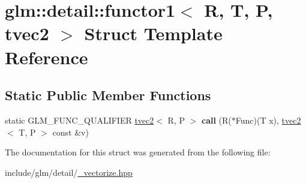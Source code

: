 \hypertarget{structglm_1_1detail_1_1functor1_3_01R_00_01T_00_01P_00_01tvec2_01_4}{}\section{glm\+:\+:detail\+:\+:functor1$<$ R, T, P, tvec2 $>$ Struct Template Reference}
\label{structglm_1_1detail_1_1functor1_3_01R_00_01T_00_01P_00_01tvec2_01_4}
\subsection*{Static Public Member Functions}
\begin{DoxyCompactItemize}
\item 
\mbox{\label{structglm_1_1detail_1_1functor1_3_01R_00_01T_00_01P_00_01tvec2_01_4_aaabd54c114db7c12681014fcbcf763bf}} 
static G\+L\+M\+\_\+\+F\+U\+N\+C\+\_\+\+Q\+U\+A\+L\+I\+F\+I\+ER \hyperlink{structglm_1_1tvec2}{tvec2}$<$ R, P $>$ {\bfseries call} (R($\ast$Func)(T x), \hyperlink{structglm_1_1tvec2}{tvec2}$<$ T, P $>$ const \&v)
\end{DoxyCompactItemize}


The documentation for this struct was generated from the following file\+:\begin{DoxyCompactItemize}
\item 
include/glm/detail/\hyperlink{__vectorize_8hpp}{\+\_\+vectorize.\+hpp}\end{DoxyCompactItemize}
